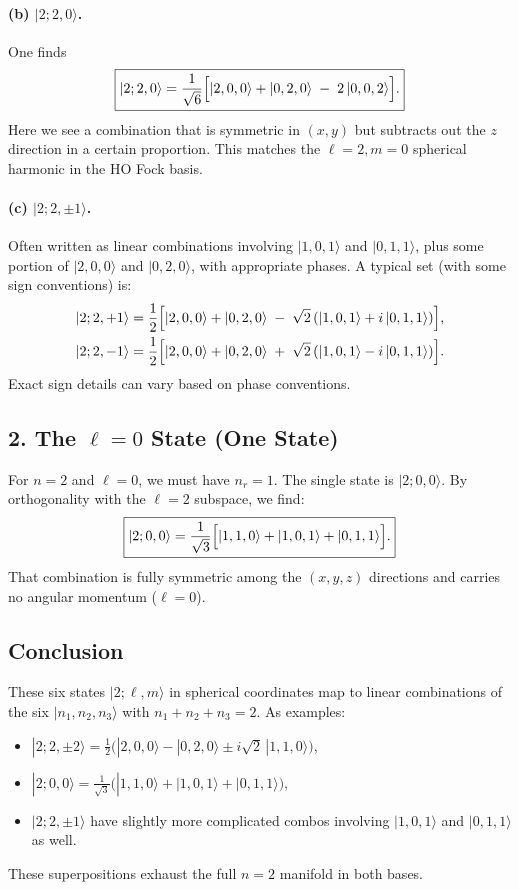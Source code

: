 \documentclass[12pt]{article}
\begin{document}
\paragraph{(b) $|2;2,0\rangle$.}
One finds
\[
\boxed{
|2;2,0\rangle = \frac{1}{\sqrt{6}}\Bigl[|2,0,0\rangle + |0,2,0\rangle \;-\; 2\,|0,0,2\rangle\Bigr].
}
\]
Here we see a combination that is symmetric in $(x,y)$ but subtracts out the $z$ direction in a certain proportion. This matches the $\ell=2,m=0$ spherical harmonic in the HO Fock basis.

\paragraph{(c) $|2;2,\pm1\rangle$.}
Often written as linear combinations involving $|1,0,1\rangle$ and $|0,1,1\rangle$, plus some portion of $|2,0,0\rangle$ and $|0,2,0\rangle$, with appropriate phases. A typical set (with some sign conventions) is:
\begin{align*}
|2;2,+1\rangle &= \frac{1}{2}\Bigl[|2,0,0\rangle + |0,2,0\rangle \;-\;\sqrt{2}\,(|1,0,1\rangle + i\,|0,1,1\rangle)\Bigr],\\
|2;2,-1\rangle &= \frac{1}{2}\Bigl[|2,0,0\rangle + |0,2,0\rangle \;+\;\sqrt{2}\,(|1,0,1\rangle - i\,|0,1,1\rangle)\Bigr].
\end{align*}
Exact sign details can vary based on phase conventions.

\subsection*{2. The $\ell=0$ State (One State)}
For $n=2$ and $\ell=0$, we must have $n_r=1$. The single state is $|2;0,0\rangle$. By orthogonality with the $\ell=2$ subspace, we find:
\[
\boxed{
|2;0,0\rangle
= \frac{1}{\sqrt{3}}\Bigl[|1,1,0\rangle + |1,0,1\rangle + |0,1,1\rangle\Bigr].
}
\]
That combination is fully symmetric among the $(x,y,z)$ directions and carries no angular momentum ($\ell=0$).

\subsection*{Conclusion}
These six states $|2;\ell,m\rangle$ in spherical coordinates map to linear combinations of the six $|n_1,n_2,n_3\rangle$ with $n_1+n_2+n_3=2$. As examples:
\begin{itemize}
\item $|2;2,\pm2\rangle = \tfrac{1}{2}\bigl(|2,0,0\rangle - |0,2,0\rangle \pm i\sqrt{2}\,|1,1,0\rangle\bigr)$,
\item $|2;0,0\rangle = \tfrac{1}{\sqrt{3}}\bigl(|1,1,0\rangle + |1,0,1\rangle + |0,1,1\rangle\bigr)$,
\item $|2;2,\pm1\rangle$ have slightly more complicated combos involving $|1,0,1\rangle$ and $|0,1,1\rangle$ as well.
\end{itemize}
These superpositions exhaust the full $n=2$ manifold in both bases.
\end{document}
